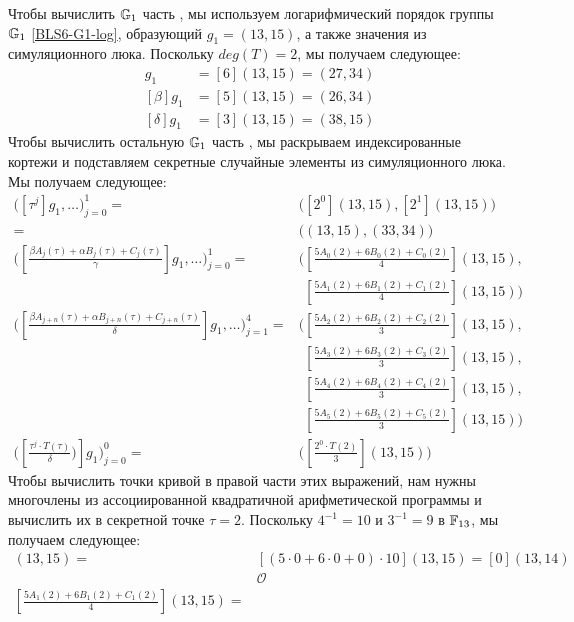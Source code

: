 \begin{example}
Чтобы вычислить $\mathbb{G}_1$ часть , мы используем логарифмический порядок группы $\mathbb{G}_1$ \ref{BLS6-G1-log}, образующий $g_1=(13,15)$, а также значения из симуляционного люка. Поскольку $deg(T)=2$, мы получаем следующее:
\begin{align*}
[\alpha]g_1 & = [6](13,15) = (27,34) \\
[\beta]g_1 & = [5](13,15) = (26,34) \\
[\delta]g_1 & = [3](13,15) = (38,15)
\end{align*}
Чтобы вычислить остальную $\mathbb{G}_1$ часть , мы раскрываем индексированные кортежи и подставляем секретные случайные элементы из симуляционного люка. Мы получаем следующее:
\begin{align*}
\Big( [\tau^{j}]g_1,\ldots\Big) _{j=0}^{1} = 
 & \Big( [2^0](13,15), [2^1](13,15)\Big)  \\
 = & \Big((13,15),(33,34)\Big)\\
\Big([\frac{\beta A_{j}(\tau)+ \alpha B_{j}(\tau) + C_{j}(\tau)}{\gamma}]g_1,\ldots\Big)_{j=0}^1 =
 & \Big([\frac{5 A_{0}(2)+6 B_{0}(2)+C_{0}(2)}{4}](13,15),\\
 &\phantom{\Big(} [\frac{5 A_{1}(2)+6 B_{1}(2)+C_{1}(2)}{4}](13,15)\Big)\\
\Big([\frac{\beta A_{j+n}(\tau)+ \alpha B_{j+n}(\tau) + C_{j+n}(\tau)}{\delta}]g_1,\ldots\Big)_{j=1}^4 = 
&  \Big( [\frac{5 A_{2}(2)+ 6 B_{2}(2) + C_{2}(2)}{3}](13,15),\\ 
& \phantom{\Big(} [\frac{5 A_{3}(2)+ 6 B_{3}(2) + C_{3}(2)}{3}](13,15),\\
& \phantom{\Big(} [\frac{5 A_{4}(2)+ 6 B_{4}(2) + C_{4}(2)}{3}](13,15),\\ 
& \phantom{\Big(} [\frac{5 A_{5}(2)+ 6 B_{5}(2) + C_{5}(2)}{3}](13,15)\Big)\\
\Big([\frac{\tau^j\cdot T(\tau)}{\delta})]g_1\Big)_{j=0}^0 = & \Big([\frac{2^0\cdot T(2)}{3}](13,15)\Big) 
\end{align*}
Чтобы вычислить точки кривой в правой части этих выражений, нам нужны многочлены из ассоциированной квадратичной арифметической программы и вычислить их в секретной точке $\tau=2$. Поскольку $4^{-1}=10$ и $3^{-1}=9$ в $\mathbb{F}_{13}$, мы получаем следующее:
\begin{align*}
[\frac{5 A_{0}(2)+6 B_{0}(2)+C_{0}(2)}{4}](13,15) = 
 & [(5 \cdot 0 +6\cdot 0 + 0)\cdot 10](13,15) = [0](13,14)\\
 & \mathcal{O} \\
[\frac{5 A_{1}(2)+6 B_{1}(2)+C_{1}(2)}{4}](13,15) = 

\end{align*}
\end{example}
